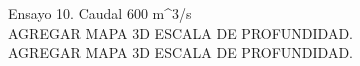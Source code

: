 Ensayo 10. Caudal 600 m^{3}/s \\

AGREGAR MAPA 3D ESCALA DE PROFUNDIDAD. \\

AGREGAR MAPA 3D ESCALA DE PROFUNDIDAD. \\

